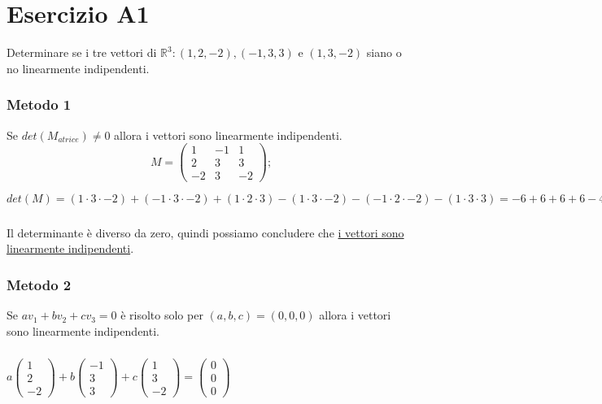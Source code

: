 \documentclass[a4paper]{report}
\newenvironment{problem}
        {
                \begin{mdframed}[topline=false,rightline=false,bottomline=false]
                        \slshape
        }
        {
                \end{mdframed}
        }
\begin{document}
        \chapter*{Esercizio A1}
        \begin{problem}
                Determinare se i tre vettori di $\mathbb{R}^3: (1,2,-2), (-1,3,3) \mbox{ e } (1,3,-2)$
                siano o no linearmente indipendenti.
        \end{problem}

        \subsection*{Metodo 1}
        Se $det(M_{atrice}) \neq 0$ allora i vettori sono linearmente indipendenti.
        \[
                M =
                \begin{pmatrix}
                        1  & -1 &  1 \\
                        2  &  3 &  3 \\
                        -2 &  3 & -2
                \end{pmatrix};
        \]

        $
                det(M) = (1 \cdot 3 \cdot -2) + (-1 \cdot 3 \cdot -2) + (1 \cdot 2 \cdot 3) - (1 \cdot 3 \cdot -2) - (-1 \cdot 2 \cdot -2) - (1 \cdot 3 \cdot 3) = -6 + 6 + 6 + 6 -4  -1.
        $

        \paragraph{}
        Il determinante \`{e} diverso da zero, quindi possiamo concludere che \ul{i vettori sono linearmente indipendenti}.

        \subsection*{Metodo 2}
        Se $ a v_1 + b v_2 + c v_3 = 0 $ \`{e} risolto solo per $(a, b, c) = (0, 0, 0)$
        allora i vettori sono linearmente indipendenti.

        \paragraph{}
        $
                a \begin{pmatrix} 1 \\ 2 \\ -2 \end{pmatrix} + b \begin{pmatrix} -1 \\ 3 \\ 3 \end{pmatrix} + c \begin{pmatrix} 1 \\ 3 \\ -2 \end{pmatrix} = \begin{pmatrix} 0 \\ 0 \\ 0 \end{pmatrix}
        $
\end{document}
